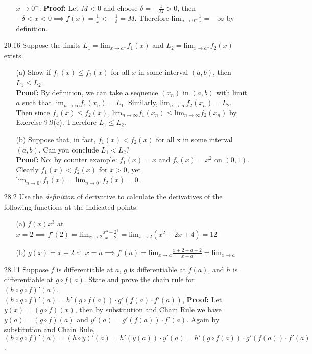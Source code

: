 \documentclass{article}
\begin{document}
\begin{itemize}
\begin{itemize}
              \item [$x\rightarrow 0^-$: ] \textbf{Proof: } Let $M<0$ and choose $\delta=-\frac{1}{M}>0$, then $-\delta<x<0\implies f(x)=\frac{1}{x}<-\frac{1}{\delta}=M$. Therefore $\text{lim}_{n\rightarrow 0^-}\frac{1}{x}=-\infty$ by definition.
          \end{itemize}
    \item [20.16] Suppose the limits $L_1=\text{lim}_{x\rightarrow a^+}f_1(x)$ and $L_2=\text{lim}_{x\rightarrow a^+}f_2(x)$ exists.
          \begin{itemize}
              \item [(a)] Show if $f_1(x)\leq f_2(x)$ for all $x$ in some interval $(a,b)$, then $L_1\leq L_2$.\\\textbf{Proof: }By definition, we can take a sequence $(x_n)$ in $(a,b)$ with limit $a$ such that $\text{lim}_{n\rightarrow\infty}f_1(x_n)=L_1$. Similarly, $\text{lim}_{n\rightarrow\infty}f_2(x_n)=L_2$. Then since $f_1(x)\leq f_2(x)$, $\text{lim}_{n\rightarrow\infty}f_1(x_n)\leq\text{lim}_{n\rightarrow\infty}f_2(x_n)$ by Exercise 9.9(c). Therefore $L_1\leq L_2$.
              \item [(b)] Suppose that, in fact, $f_1(x)<f_2(x)$ for all x in some interval $(a,b)$. Can you conclude $L_1<L_2$?\\\textbf{Proof: } No; by counter example: $f_1(x)=x$ and $f_2(x)=x^2$ on $(0,1)$. Clearly $f_1(x)<f_2(x)$ for $x>0$, yet $\text{lim}_{n\rightarrow 0^+}f_1(x)=\text{lim}_{n\rightarrow 0^+}f_2(x)=0$.
          \end{itemize}
    \item [28.2] Use the \textit{definition} of derivative to calculate the derivatives of the following functions at the indicated points.
          \begin{itemize}
              \item [(a)] $f(x)x^3$ at $x=2\implies f'(2)=\text{lim}_{x\rightarrow 2}\frac{x^3-2^3}{x-2}=\text{lim}_{x\rightarrow 2}(x^2+2x+4)=12$
              \item [(b)] $g(x)=x+2$ at $x=a\implies f'(a)=\text{lim}_{x\rightarrow a}\frac{x+2-a-2}{x-a}=\text{lim}_{x\rightarrow a}$
          \end{itemize}
    \item [28.11] Suppose $f$ is differentiable at $a$, $g$ is differentiable at $f(a)$, and $h$ is differentiable at $g\circ f(a)$. State and prove the chain rule for $(h\circ g\circ f)'(a)$.\\$(h\circ g\circ f)'(a)=h'(g\circ f(a))\cdot g'(f(a)\cdot f'(a))$, \textbf{Proof: } Let $y(x)=(g\circ f)(x)$, then by substitution and Chain Rule we have $y(a)=(g\circ f)(a)$ and $y'(a)=g'(f(a))\cdot f'(a)$. Again by substitution and Chain Rule, $(h\circ g\circ f)'(a)=(h\circ y)'(a)=h'(y(a))\cdot y'(a)=h'(g\circ f(a))\cdot g'(f(a))\cdot f'(a)$.

\end{itemize}
\end{document}
